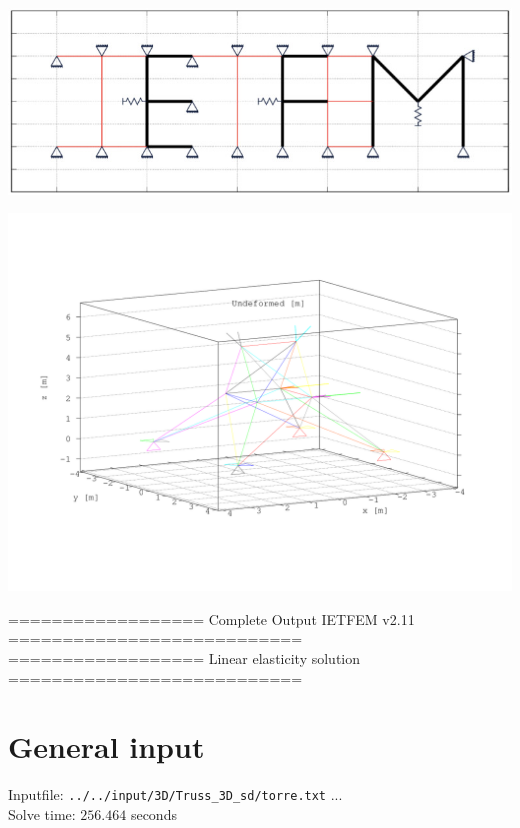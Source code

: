 \documentclass[a4paper,11pt]{article}
\begin{document}
\hspace{1.5cm}       
\begin{center}       
\includegraphics[width=.7\textwidth]{../../../../../../sources/Figs/logo_ietfem}      
\end{center}       
\begin{center}       
\includegraphics[width=.95\textwidth]{../../torre_undeformed.png}   
   \end{center}       

\newpage 

================== Complete Output IETFEM v2.11 ===========================\\
================== Linear elasticity solution ===========================
\tableofcontents     

\newpage     

\section{General input}

Inputfile: \verb|../../input/3D/Truss_3D_sd/torre.txt|  ... \\

Solve time: $256.464$ seconds \\
\end{document}
